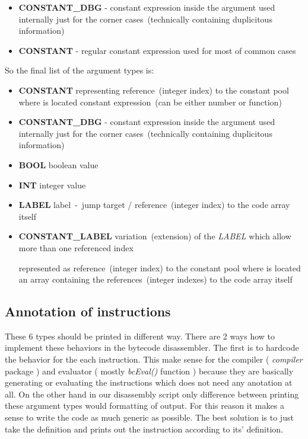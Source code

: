 \documentclass[thesis=M,english]{FITthesis}[2018/10/20]
\begin{document}
\begin{itemize}
	\item \textbf{CONSTANT{\_}DBG} - constant expression inside the argument used internally just for the corner cases~(technically containing duplicitous information)

	\item \textbf{CONSTANT} - regular constant expression used for most of common cases
\end{itemize}

So the final list of the argument types is:

\begin{itemize}
	\item \textbf{CONSTANT} representing reference~(integer index) to the constant pool where is located constant expression~(can be either number or function)

	\item \textbf{CONSTANT{\_}DBG} - constant expression inside the argument used internally just for the corner cases~(technically containing duplicitous information)

	\item \textbf{BOOL} boolean value

	\item \textbf{INT} integer value

	\item \textbf{LABEL} label~-~jump target / reference~(integer index) to the code array itself

	\item \textbf{CONSTANT{\_}LABEL} variation~(extension) of the \textit{LABEL} which allow more than one referenced index
	
	represented as reference~(integer index) to the constant pool where is located an array containing the references~(integer indexes) to the code array itself
\end{itemize}

\subsection{Annotation of instructions}
These 6 types should be printed in different way. There are 2 ways how to implement these behaviors in the bytecode disassembler. The first is to hardcode the behavior for the each instruction. This make sense for the compiler ( \textit{compiler} package ) and evaluator ( mostly \textit{bcEval()} function ) because they are basically generating or evaluating the instructions which does not need any anotation at all. On the other hand in our disassembly script only difference between printing these argument types would formatting of output. For this reason it makes a sense to write the code as much generic as possible. The best solution is to just take the definition and prints out the instruction according to its' definition.
\end{document}
